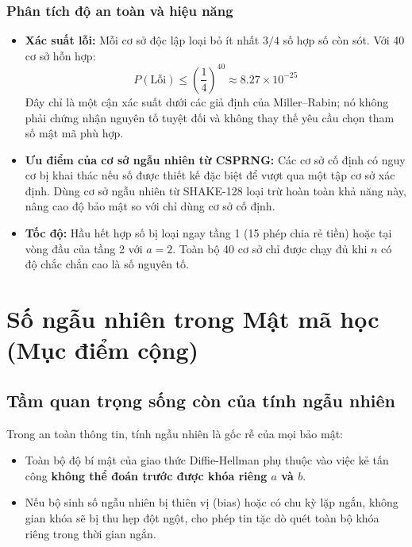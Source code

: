 \documentclass[12pt,a4paper]{article}
\theoremstyle{plain}
\begin{document}
\subsubsection{Phân tích độ an toàn và hiệu năng}
\begin{itemize}
    \item \textbf{Xác suất lỗi:} Mỗi cơ sở độc lập loại bỏ ít nhất $3/4$ số hợp số còn sót. Với 40 cơ sở hỗn hợp:
    \begin{equation}
    P(\text{Lỗi}) \le \left(\frac{1}{4}\right)^{40} \approx 8.27 \times 10^{-25}
    \end{equation}
    Đây chỉ là một cận xác suất dưới các giả định của Miller--Rabin; nó không phải chứng nhận nguyên tố tuyệt đối và không thay thế yêu cầu chọn tham số mật mã phù hợp.
    \item \textbf{Ưu điểm của cơ sở ngẫu nhiên từ CSPRNG:} Các cơ sở cố định có nguy cơ bị khai thác nếu số được thiết kế đặc biệt để vượt qua một tập cơ sở xác định. Dùng cơ sở ngẫu nhiên từ SHAKE-128 loại trừ hoàn toàn khả năng này, nâng cao độ bảo mật so với chỉ dùng cơ sở cố định.
    \item \textbf{Tốc độ:} Hầu hết hợp số bị loại ngay tầng 1 (15 phép chia rẻ tiền) hoặc tại vòng đầu của tầng 2 với $a = 2$. Toàn bộ 40 cơ sở chỉ được chạy đủ khi $n$ có độ chắc chắn cao là số nguyên tố.
\end{itemize}

\newpage
\section{Số ngẫu nhiên trong Mật mã học (Mục điểm cộng)}

\subsection{Tầm quan trọng sống còn của tính ngẫu nhiên}
Trong an toàn thông tin, tính ngẫu nhiên là gốc rễ của mọi bảo mật:
\begin{itemize}
    \item Toàn bộ độ bí mật của giao thức Diffie-Hellman phụ thuộc vào việc kẻ tấn công \textbf{không thể đoán trước được khóa riêng $a$ và $b$}.
    \item Nếu bộ sinh số ngẫu nhiên bị thiên vị (bias) hoặc có chu kỳ lặp ngắn, không gian khóa sẽ bị thu hẹp đột ngột, cho phép tin tặc dò quét toàn bộ khóa riêng trong thời gian ngắn.
\end{itemize}
\end{document}
